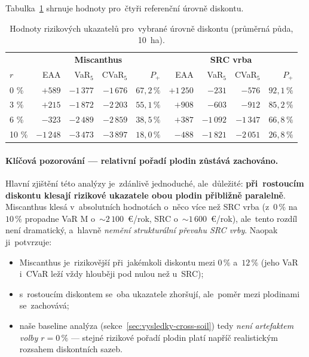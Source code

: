 Tabulka~\ref{tab:vysledky-diskont-body} shrnuje hodnoty pro~čtyři
referenční úrovně diskontu.

\begin{table}[H]
\centering
\caption{Hodnoty rizikových ukazatelů pro~vybrané úrovně diskontu
(průměrná půda, 10~ha).}
\label{tab:vysledky-diskont-body}
\small
\renewcommand{\arraystretch}{1.15}
\begin{tabular}{l|rrrr|rrrr}
\toprule
& \multicolumn{4}{c|}{\textbf{Miscanthus}} & \multicolumn{4}{c}{\textbf{SRC vrba}} \\
$r$  & EAA  & VaR$_5$ & CVaR$_5$ & $P_+$  & EAA  & VaR$_5$ & CVaR$_5$ & $P_+$ \\
\midrule
0 \%   & $+589$    & $-1\,377$ & $-1\,676$ & $67{,}2\,\%$ & $+1\,250$ & $-231$    & $-576$    & $92{,}1\,\%$ \\
3 \%   & $+215$    & $-1\,872$ & $-2\,203$ & $55{,}1\,\%$ & $+908$    & $-603$    & $-912$    & $85{,}2\,\%$ \\
6 \%   & $-323$    & $-2\,489$ & $-2\,859$ & $38{,}5\,\%$ & $+387$    & $-1\,092$ & $-1\,347$ & $66{,}8\,\%$ \\
10 \%  & $-1\,248$ & $-3\,473$ & $-3\,897$ & $18{,}0\,\%$ & $-488$    & $-1\,821$ & $-2\,051$ & $26{,}8\,\%$ \\
\bottomrule
\end{tabular}
\end{table}

\paragraph{Klíčová pozorování --- relativní pořadí plodin zůstává zachováno.}
Hlavní zjištění této analýzy je~zdánlivě jednoduché, ale~důležité:
\textbf{při~rostoucím diskontu klesají rizikové ukazatele obou plodin
přibližně paralelně}. Miscanthus klesá v~absolutních hodnotách o~něco
více než SRC vrba (z~$0\,\%$ na~$10\,\%$ propadne VaR M o~$\sim 2\,100$~€/rok,
SRC o~$\sim 1\,600$~€/rok), ale~tento rozdíl není dramatický, a~hlavně
\emph{nemění strukturální převahu SRC vrby}. Naopak ji~potvrzuje:
\begin{itemize}
\item Miscanthus je~rizikovější při~jakémkoli diskontu mezi $0\,\%$
      a~$12\,\%$ (jeho VaR i~CVaR leží vždy hlouběji pod nulou než u~SRC);
\item s~rostoucím diskontem se~oba ukazatele zhoršují, ale~poměr mezi
      plodinami se~zachovává;
\item naše baseline analýza (sekce~\ref{sec:vysledky-cross-soil}) tedy
      \emph{není artefaktem volby $r = 0\,\%$} --- stejné rizikové
      pořadí plodin platí napříč realistickým rozsahem diskontních sazeb.
\end{itemize}


